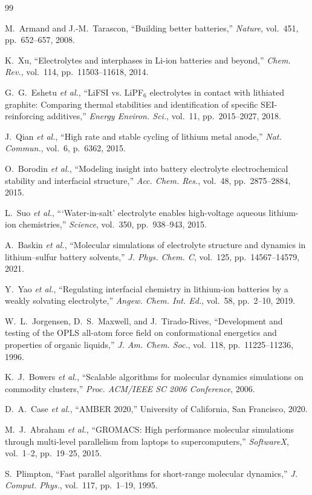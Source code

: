 \documentclass[twocolumn,10pt]{article}
\begin{document}
\FloatBarrier
\begin{thebibliography}{99}

 M.~Armand and J.-M.~Tarascon, ``Building better batteries,'' \textit{Nature}, vol.~451, pp.~652--657, 2008.

 K.~Xu, ``Electrolytes and interphases in Li-ion batteries and beyond,'' \textit{Chem. Rev.}, vol.~114, pp.~11503--11618, 2014.

 G.~G.~Eshetu \textit{et al.}, ``LiFSI vs. LiPF$_6$ electrolytes in contact with lithiated graphite: Comparing thermal stabilities and identification of specific SEI-reinforcing additives,'' \textit{Energy Environ. Sci.}, vol.~11, pp.~2015--2027, 2018.

 J.~Qian \textit{et al.}, ``High rate and stable cycling of lithium metal anode,'' \textit{Nat. Commun.}, vol.~6, p.~6362, 2015.

 O.~Borodin \textit{et al.}, ``Modeling insight into battery electrolyte electrochemical stability and interfacial structure,'' \textit{Acc. Chem. Res.}, vol.~48, pp.~2875--2884, 2015.

 L.~Suo \textit{et al.}, ```Water-in-salt' electrolyte enables high-voltage aqueous lithium-ion chemistries,'' \textit{Science}, vol.~350, pp.~938--943, 2015.

 A.~Baskin \textit{et al.}, ``Molecular simulations of electrolyte structure and dynamics in lithium--sulfur battery solvents,'' \textit{J. Phys. Chem. C}, vol.~125, pp.~14567--14579, 2021.

 Y.~Yao \textit{et al.}, ``Regulating interfacial chemistry in lithium-ion batteries by a weakly solvating electrolyte,'' \textit{Angew. Chem. Int. Ed.}, vol.~58, pp.~2--10, 2019.

 W.~L.~Jorgensen, D.~S.~Maxwell, and J.~Tirado-Rives, ``Development and testing of the OPLS all-atom force field on conformational energetics and properties of organic liquids,'' \textit{J. Am. Chem. Soc.}, vol.~118, pp.~11225--11236, 1996.

 K.~J.~Bowers \textit{et al.}, ``Scalable algorithms for molecular dynamics simulations on commodity clusters,'' \textit{Proc. ACM/IEEE SC 2006 Conference}, 2006.

 D.~A.~Case \textit{et al.}, ``AMBER 2020,'' University of California, San Francisco, 2020.

 M.~J.~Abraham \textit{et al.}, ``GROMACS: High performance molecular simulations through multi-level parallelism from laptops to supercomputers,'' \textit{SoftwareX}, vol.~1--2, pp.~19--25, 2015.

 S.~Plimpton, ``Fast parallel algorithms for short-range molecular dynamics,'' \textit{J. Comput. Phys.}, vol.~117, pp.~1--19, 1995.

\end{thebibliography}
\end{document}
